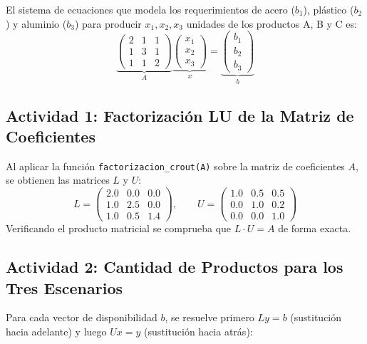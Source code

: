 \documentclass[11pt,a4paper]{article}
\begin{document}
El sistema de ecuaciones que modela los requerimientos de acero ($b_1$), plástico ($b_2$) y aluminio ($b_3$) para producir $x_1, x_2, x_3$ unidades de los productos A, B y C es:
\begin{equation}
    \underbrace{\begin{pmatrix}
        2 & 1 & 1 \\
        1 & 3 & 1 \\
        1 & 1 & 2
    \end{pmatrix}}_{A}
    \underbrace{\begin{pmatrix}
        x_1 \\ x_2 \\ x_3
    \end{pmatrix}}_{x}
    =
    \underbrace{\begin{pmatrix}
        b_1 \\ b_2 \\ b_3
    \end{pmatrix}}_{b}
\end{equation}

\subsection{Actividad 1: Factorización LU de la Matriz de Coeficientes}
Al aplicar la función \texttt{factorizacion\_crout(A)} sobre la matriz de coeficientes $A$, se obtienen las matrices $L$ y $U$:
\begin{equation}
    L = \begin{pmatrix}
        2.0 & 0.0 & 0.0 \\
        1.0 & 2.5 & 0.0 \\
        1.0 & 0.5 & 1.4
    \end{pmatrix}, \qquad
    U = \begin{pmatrix}
        1.0 & 0.5 & 0.5 \\
        0.0 & 1.0 & 0.2 \\
        0.0 & 0.0 & 1.0
    \end{pmatrix}
\end{equation}
Verificando el producto matricial se comprueba que $L \cdot U = A$ de forma exacta.

\subsection{Actividad 2: Cantidad de Productos para los Tres Escenarios}
Para cada vector de disponibilidad $b$, se resuelve primero $Ly = b$ (sustitución hacia adelante) y luego $Ux = y$ (sustitución hacia atrás):
\end{document}
